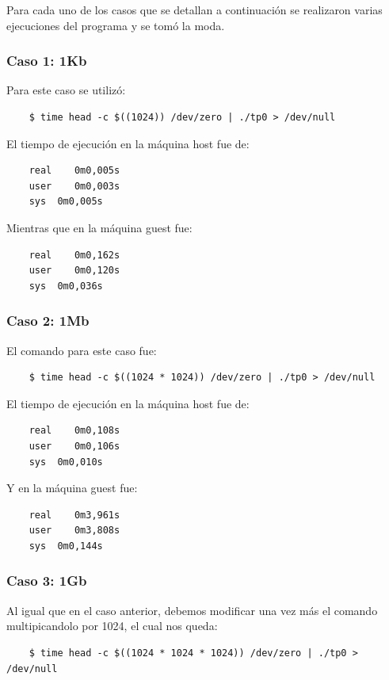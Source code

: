 \documentclass[titlepage,a4paper]{article}
\begin{document}
Para cada uno de los casos que se detallan a continuación se realizaron varias ejecuciones del programa y se tomó la moda.

\subsubsection{Caso 1: 1Kb}

Para este caso se utilizó:
\begin{verbatim}
    $ time head -c $((1024)) /dev/zero | ./tp0 > /dev/null
\end{verbatim}

El tiempo de ejecución en la máquina host fue de:

\begin{verbatim}
    real	0m0,005s
    user	0m0,003s
    sys	 0m0,005s
\end{verbatim}

Mientras que en la máquina guest fue:

\begin{verbatim}
    real	0m0,162s
    user	0m0,120s
    sys	 0m0,036s
\end{verbatim}

\subsubsection{Caso 2: 1Mb}

El comando para este caso fue:
\begin{verbatim}
    $ time head -c $((1024 * 1024)) /dev/zero | ./tp0 > /dev/null
\end{verbatim}

El tiempo de ejecución en la máquina host fue de:

\begin{verbatim}
    real	0m0,108s
    user	0m0,106s
    sys	 0m0,010s
\end{verbatim}

Y en la máquina guest fue:

\begin{verbatim}
    real	0m3,961s
    user	0m3,808s
    sys	 0m0,144s
\end{verbatim}

\subsubsection{Caso 3: 1Gb}

Al igual que en el caso anterior, debemos modificar una vez más el comando multipicandolo  por 1024, el cual nos queda:
\begin{verbatim}
    $ time head -c $((1024 * 1024 * 1024)) /dev/zero | ./tp0 > /dev/null
\end{verbatim}
\end{document}
